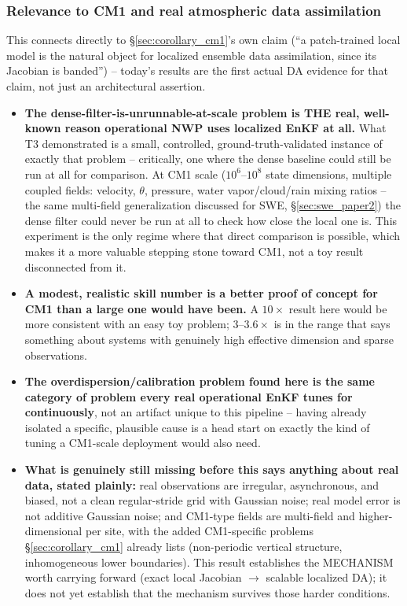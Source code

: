 \documentclass[11pt]{article}
\begin{document}
\subsubsection*{Relevance to CM1 and real atmospheric data assimilation}
This connects directly to \S\ref{sec:corollary_cm1}'s own claim
(``a patch-trained local model is the natural object for localized
ensemble data assimilation, since its Jacobian is banded'') -- today's
results are the first actual DA evidence for that claim, not just an
architectural assertion.
\begin{itemize}[leftmargin=*]
\item \textbf{The dense-filter-is-unrunnable-at-scale problem is THE
  real, well-known reason operational NWP uses localized EnKF at all.}
  What T3 demonstrated is a small, controlled, ground-truth-validated
  instance of exactly that problem -- critically, one where the dense
  baseline could still be run at all for comparison. At CM1 scale
  ($10^6$--$10^8$ state dimensions, multiple coupled fields: velocity,
  $\theta$, pressure, water vapor/cloud/rain mixing ratios -- the same
  multi-field generalization discussed for SWE, \S\ref{sec:swe_paper2})
  the dense filter could never be run at all to check how close the
  local one is. This experiment is the only regime where that direct
  comparison is possible, which makes it a more valuable stepping stone
  toward CM1, not a toy result disconnected from it.
\item \textbf{A modest, realistic skill number is a better proof of
  concept for CM1 than a large one would have been.} A $10\times$ result
  here would be more consistent with an easy toy problem; $3$--$3.6\times$
  is in the range that says something about systems with genuinely high
  effective dimension and sparse observations.
\item \textbf{The overdispersion/calibration problem found here is the
  same category of problem every real operational EnKF tunes for
  continuously}, not an artifact unique to this pipeline -- having
  already isolated a specific, plausible cause is a head start on
  exactly the kind of tuning a CM1-scale deployment would also need.
\item \textbf{What is genuinely still missing before this says anything
  about real data, stated plainly:} real observations are irregular,
  asynchronous, and biased, not a clean regular-stride grid with
  Gaussian noise; real model error is not additive Gaussian noise; and
  CM1-type fields are multi-field and higher-dimensional per site, with
  the added CM1-specific problems \S\ref{sec:corollary_cm1} already
  lists (non-periodic vertical structure, inhomogeneous lower
  boundaries). This result establishes the MECHANISM worth carrying
  forward (exact local Jacobian $\to$ scalable localized DA); it does
  not yet establish that the mechanism survives those harder conditions.
\end{itemize}
\end{document}
